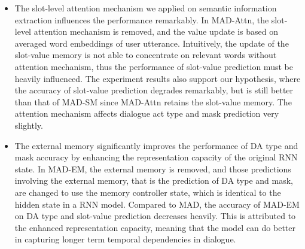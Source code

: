 \begin{itemize}
    \item The slot-level attention mechanism we applied on semantic information extraction influences the performance remarkably. In MAD-Attn, the slot-level attention mechanism is removed, and the value update is based on averaged word embeddings of user utterance. Intuitively, the update of the slot-value memory is not able to concentrate on relevant words without attention mechanism, thus the performance of slot-value prediction must be heavily influenced. The experiment results also support our hypothesis, where the accuracy of slot-value prediction degrades remarkably, but is still better than that of MAD-SM since MAD-Attn retains the slot-value memory. The attention mechanism affects dialogue act type and mask prediction very slightly.
    
    \item The external memory significantly improves the performance of DA type and mask accuracy by enhancing the representation capacity of the original RNN state. In MAD-EM, the external memory is removed, and those predictions involving the external memory, that is the prediction of DA type and mask, are changed to use the memory controller state, which is identical to the hidden state in a RNN model. Compared to MAD, the accuracy of MAD-EM on DA type and slot-value prediction decreases heavily. This is attributed to the enhanced representation capacity, meaning that the model can do better in capturing longer term temporal dependencies in dialogue.
\end{itemize}





